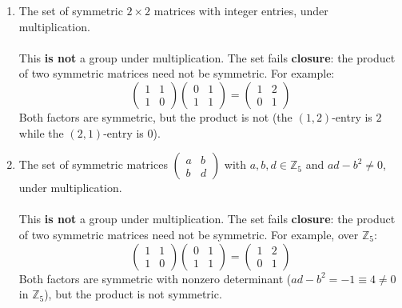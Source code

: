 \documentclass{article}
\newcommand{\Zn}[1]{\mathbb{Z}_{#1}}
\begin{document}
\begin{enumerate}
\begin{enumerate}
\[                = \begin{pmatrix} a+e & b+f \\ b+f & d+g \end{pmatrix}
                = \begin{pmatrix} e & f \\ f & g \end{pmatrix} + \begin{pmatrix} a & b \\ b & d \end{pmatrix}
            \]

            \item The set of symmetric $2 \times 2$ matrices with integer entries, under multiplication.
            \\
            \\ This \textbf{is not} a group under multiplication. The set fails \textbf{closure}: the product of two symmetric matrices need not be symmetric. For example:
            \[
                \begin{pmatrix} 1 & 1 \\ 1 & 0 \end{pmatrix} \begin{pmatrix} 0 & 1 \\ 1 & 1 \end{pmatrix}
                = \begin{pmatrix} 1 & 2 \\ 0 & 1 \end{pmatrix}
            \]
            Both factors are symmetric, but the product is not (the $(1,2)$-entry is $2$ while the $(2,1)$-entry is $0$).

            \item The set of symmetric matrices $\begin{pmatrix} a & b \\ b & d \end{pmatrix}$ with $a,b,d \in \Zn{5}$ and $ad-b^2 \neq 0$, under multiplication.
            \\
            \\ This \textbf{is not} a group under multiplication. The set fails \textbf{closure}: the product of two symmetric matrices need not be symmetric. For example, over $\Zn{5}$:
            \[
                \begin{pmatrix} 1 & 1 \\ 1 & 0 \end{pmatrix} \begin{pmatrix} 0 & 1 \\ 1 & 1 \end{pmatrix}
                = \begin{pmatrix} 1 & 2 \\ 0 & 1 \end{pmatrix}
            \]
            Both factors are symmetric with nonzero determinant ($ad-b^2 = -1 \equiv 4 \neq 0$ in $\Zn{5}$), but the product is not symmetric.


\end{enumerate}
\end{enumerate}
\end{document}
